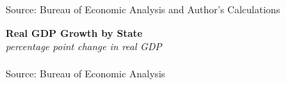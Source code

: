 \documentclass{report}
\begin{document}
\footnotesize{Source: Bureau of Economic Analysis and Author's Calculations}
\newpage

\noindent \normalsize \textbf{Real GDP Growth by State}\\
\footnotesize{\textit{percentage point change in real GDP}}\\
\vspace{-2mm}
\hspace{-8mm}  \\
\footnotesize{Source: Bureau of Economic Analysis}\\

\vspace{2mm}

\begin{minipage}{0.76\textwidth}

\small  
\end{minipage}

\vspace{2mm}
\end{document}

